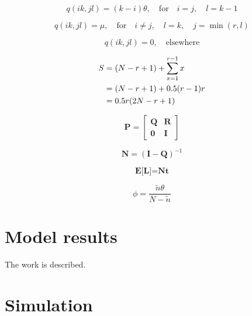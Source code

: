 \documentclass[10pt,a4paper,conference]{IEEEtran}
\begin{document}
\begin{equation}
    q(i k,j l) = (k - i)\theta,\quad\textrm{for}\quad i = j,\quad l = k - 1
\end{equation}

\begin{equation}
    q(i k,j l) = \mu,\quad\textrm{for}\quad i \neq j,\quad l = k,\quad j = \min(r, l)
\end{equation}

\begin{equation}
    q(i k,j l) = 0,\quad\textrm{elsewhere}
\end{equation}

\begin{align}\label{states_num}
       S & = (N - r + 1) + \sum_{x=1}^{r-1} x\notag \\
         & = (N - r + 1) + 0.5 (r - 1) r\notag \\
         & = 0.5 r (2 N - r + 1)
\end{align}

\begin{equation}
    \textbf{P} = \left[\begin{array}{c|c}
                   \textbf{Q} & \textbf{R} \\
                   \hline
                   \textbf{0} & \textbf{I}
                 \end{array}\right]
\end{equation}

\begin{equation}
    \textbf{N} = (\textbf{I} - \textbf{Q})^{-1}
\end{equation}

\begin{equation}
    \textbf{E[L]} = \textbf{Nt}
\end{equation}

\begin{equation}
    \phi = \frac{\tilde{n}\theta}{N - \tilde{n}}
\end{equation}

\section{Model results}
\label{results}

The work is described.

\section{Simulation}
\label{simulation}
\end{document}
